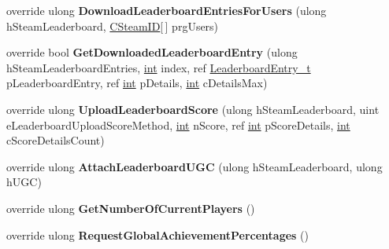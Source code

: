 \begin{DoxyCompactItemize}
\item 
\hypertarget{classValve_1_1Steamworks_1_1CSteamUserStats_a6c10d55115bf23f67082f6dbede1bf7a}{}override ulong {\bfseries Download\+Leaderboard\+Entries\+For\+Users} (ulong h\+Steam\+Leaderboard, \hyperlink{structValve_1_1Steamworks_1_1CSteamID}{C\+Steam\+I\+D}\mbox{[}$\,$\mbox{]} prg\+Users)\label{classValve_1_1Steamworks_1_1CSteamUserStats_a6c10d55115bf23f67082f6dbede1bf7a}

\item 
\hypertarget{classValve_1_1Steamworks_1_1CSteamUserStats_aa8a9a47478ec16688a0a0eda62219366}{}override bool {\bfseries Get\+Downloaded\+Leaderboard\+Entry} (ulong h\+Steam\+Leaderboard\+Entries, \hyperlink{SDL__thread_8h_a6a64f9be4433e4de6e2f2f548cf3c08e}{int} index, ref \hyperlink{structValve_1_1Steamworks_1_1LeaderboardEntry__t}{Leaderboard\+Entry\+\_\+t} p\+Leaderboard\+Entry, ref \hyperlink{SDL__thread_8h_a6a64f9be4433e4de6e2f2f548cf3c08e}{int} p\+Details, \hyperlink{SDL__thread_8h_a6a64f9be4433e4de6e2f2f548cf3c08e}{int} c\+Details\+Max)\label{classValve_1_1Steamworks_1_1CSteamUserStats_aa8a9a47478ec16688a0a0eda62219366}

\item 
\hypertarget{classValve_1_1Steamworks_1_1CSteamUserStats_af1a99475793c5e1fc86899a899b2784c}{}override ulong {\bfseries Upload\+Leaderboard\+Score} (ulong h\+Steam\+Leaderboard, uint e\+Leaderboard\+Upload\+Score\+Method, \hyperlink{SDL__thread_8h_a6a64f9be4433e4de6e2f2f548cf3c08e}{int} n\+Score, ref \hyperlink{SDL__thread_8h_a6a64f9be4433e4de6e2f2f548cf3c08e}{int} p\+Score\+Details, \hyperlink{SDL__thread_8h_a6a64f9be4433e4de6e2f2f548cf3c08e}{int} c\+Score\+Details\+Count)\label{classValve_1_1Steamworks_1_1CSteamUserStats_af1a99475793c5e1fc86899a899b2784c}

\item 
\hypertarget{classValve_1_1Steamworks_1_1CSteamUserStats_a9c060611a45fece363544dd859308110}{}override ulong {\bfseries Attach\+Leaderboard\+U\+G\+C} (ulong h\+Steam\+Leaderboard, ulong h\+U\+G\+C)\label{classValve_1_1Steamworks_1_1CSteamUserStats_a9c060611a45fece363544dd859308110}

\item 
\hypertarget{classValve_1_1Steamworks_1_1CSteamUserStats_a18c40e4bb2b97c84fabca2ee5d58bd56}{}override ulong {\bfseries Get\+Number\+Of\+Current\+Players} ()\label{classValve_1_1Steamworks_1_1CSteamUserStats_a18c40e4bb2b97c84fabca2ee5d58bd56}

\item 
\hypertarget{classValve_1_1Steamworks_1_1CSteamUserStats_ac45c85b00fb30be99b77b8b29f4d6e09}{}override ulong {\bfseries Request\+Global\+Achievement\+Percentages} ()\label{classValve_1_1Steamworks_1_1CSteamUserStats_ac45c85b00fb30be99b77b8b29f4d6e09}


\end{DoxyCompactItemize}
